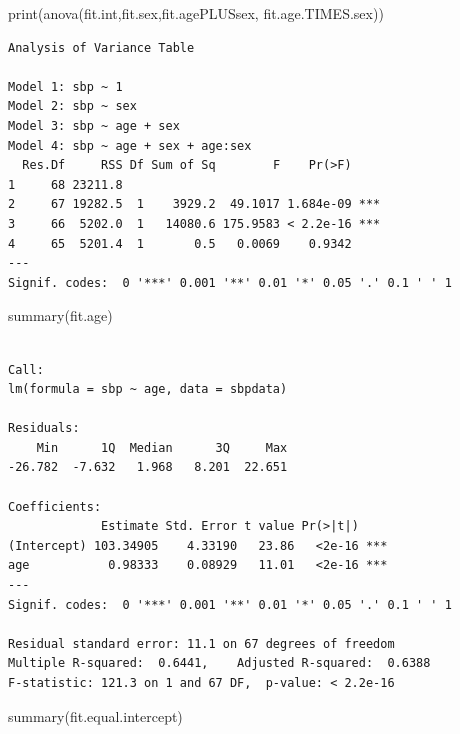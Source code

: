 \documentclass[
  letterpaper,
  DIV=11,
  numbers=noendperiod]{scrreprt}
\newenvironment{Shaded}{\begin{snugshade}}{\end{snugshade}}
\newcommand{\FunctionTok}[1]{\textcolor[rgb]{0.28,0.35,0.67}{#1}}
\newcommand{\NormalTok}[1]{\textcolor[rgb]{0.00,0.23,0.31}{#1}}
\begin{document}
\begin{Shaded}
\begin{Highlighting}[]
\FunctionTok{print}\NormalTok{(}\FunctionTok{anova}\NormalTok{(fit.int,fit.sex,fit.agePLUSsex, fit.age.TIMES.sex))}
\end{Highlighting}
\end{Shaded}

\begin{verbatim}
Analysis of Variance Table

Model 1: sbp ~ 1
Model 2: sbp ~ sex
Model 3: sbp ~ age + sex
Model 4: sbp ~ age + sex + age:sex
  Res.Df     RSS Df Sum of Sq        F    Pr(>F)    
1     68 23211.8                                    
2     67 19282.5  1    3929.2  49.1017 1.684e-09 ***
3     66  5202.0  1   14080.6 175.9583 < 2.2e-16 ***
4     65  5201.4  1       0.5   0.0069    0.9342    
---
Signif. codes:  0 '***' 0.001 '**' 0.01 '*' 0.05 '.' 0.1 ' ' 1
\end{verbatim}

\begin{Shaded}
\begin{Highlighting}[]
\FunctionTok{summary}\NormalTok{(fit.age)}
\end{Highlighting}
\end{Shaded}

\begin{verbatim}

Call:
lm(formula = sbp ~ age, data = sbpdata)

Residuals:
    Min      1Q  Median      3Q     Max 
-26.782  -7.632   1.968   8.201  22.651 

Coefficients:
             Estimate Std. Error t value Pr(>|t|)    
(Intercept) 103.34905    4.33190   23.86   <2e-16 ***
age           0.98333    0.08929   11.01   <2e-16 ***
---
Signif. codes:  0 '***' 0.001 '**' 0.01 '*' 0.05 '.' 0.1 ' ' 1

Residual standard error: 11.1 on 67 degrees of freedom
Multiple R-squared:  0.6441,    Adjusted R-squared:  0.6388 
F-statistic: 121.3 on 1 and 67 DF,  p-value: < 2.2e-16
\end{verbatim}

\begin{Shaded}
\begin{Highlighting}[]
\FunctionTok{summary}\NormalTok{(fit.equal.intercept)}
\end{Highlighting}
\end{Shaded}
\end{document}
